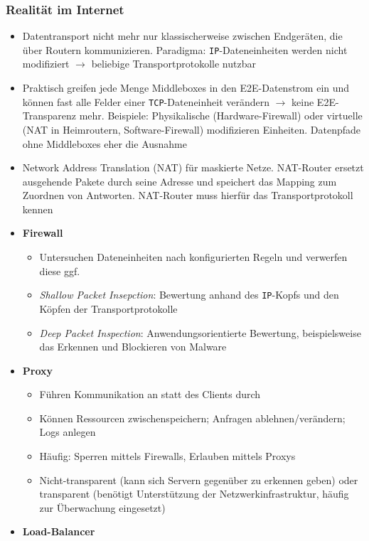 \subsubsection{Realität im Internet}
\begin{itemize}
	\item Datentransport nicht mehr nur klassischerweise zwischen Endgeräten, die über Routern kommunizieren. Paradigma: \texttt{IP}-Dateneinheiten werden nicht modifiziert \(\rightarrow\) beliebige Transportprotokolle nutzbar
	\item Praktisch greifen jede Menge Middleboxes in den E2E-Datenstrom ein und können fast alle Felder einer \texttt{TCP}-Dateneinheit verändern \(\rightarrow\) keine E2E-Transparenz mehr. Beispiele: Physikalische (Hardware-Firewall) oder virtuelle (NAT in Heimroutern, Software-Firewall) modifizieren Einheiten. Datenpfade ohne Middleboxes eher die Ausnahme
	\item Network Address Translation (NAT) für maskierte Netze. NAT-Router ersetzt ausgehende Pakete durch seine Adresse und speichert das Mapping zum Zuordnen von Antworten. NAT-Router muss hierfür das Transportprotokoll kennen
	\item \textbf{Firewall}
	\begin{itemize}
		\item Untersuchen Dateneinheiten nach konfigurierten Regeln und verwerfen diese ggf.
		\item \textit{Shallow Packet Insepction}: Bewertung anhand des \texttt{IP}-Kopfs und den Köpfen der Transportprotokolle
		\item \textit{Deep Packet Inspection}: Anwendungsorientierte Bewertung, beispielsweise das Erkennen und Blockieren von Malware
	\end{itemize}
	\item \textbf{Proxy}
	\begin{itemize}
		\item Führen Kommunikation an statt des Clients durch
		\item Können Ressourcen zwischenspeichern; Anfragen ablehnen/verändern; Logs anlegen
		\item Häufig: Sperren mittels Firewalls, Erlauben mittels Proxys
		\item Nicht-transparent (kann sich Servern gegenüber zu erkennen geben) oder transparent (benötigt Unterstützung der Netzwerkinfrastruktur, häufig zur Überwachung eingesetzt)
	\end{itemize}
	\item \textbf{Load-Balancer}

\end{itemize}
